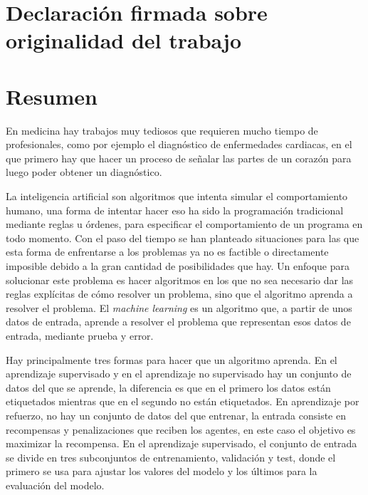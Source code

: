 \documentclass[12pt,a4paper]{article}
\begin{document}
\newpage
\listoftables

\newpage
{}
\section*{Declaración firmada sobre originalidad del trabajo}

\newpage
\section*{Resumen}
En medicina hay trabajos muy tediosos que requieren mucho tiempo de profesionales, como por ejemplo el diagnóstico de enfermedades cardiacas, en el que primero hay que hacer un proceso de señalar las partes de un corazón para luego poder obtener un diagnóstico.
\bigskip

La inteligencia artificial son algoritmos que intenta simular el comportamiento humano, una forma de intentar hacer eso ha sido la programación tradicional mediante reglas u órdenes, para especificar el comportamiento de un programa en todo momento. Con el paso del tiempo se han planteado situaciones para las que esta forma de enfrentarse a los problemas ya no es factible o directamente imposible debido a la gran cantidad de posibilidades que hay. Un enfoque para solucionar este problema es hacer algoritmos en los que no sea necesario dar las reglas explícitas de cómo resolver un problema, sino que el algoritmo aprenda a resolver el problema. El \textit{machine learning} es un algoritmo que, a partir de unos datos de entrada, aprende a resolver el problema que representan esos datos de entrada, mediante prueba y error.
\bigskip

Hay principalmente tres formas para hacer que un algoritmo aprenda. En el aprendizaje supervisado y en el aprendizaje no supervisado hay un conjunto de datos del que se aprende, la diferencia es que en el primero los datos están etiquetados mientras que en el segundo no están etiquetados. En aprendizaje por refuerzo, no hay un conjunto de datos del que entrenar, la entrada consiste en recompensas y penalizaciones que reciben los agentes, en este caso el objetivo es maximizar la recompensa. En el aprendizaje supervisado, el conjunto de entrada se divide en tres subconjuntos de entrenamiento, validación y test, donde el primero se usa para ajustar los valores del modelo y los últimos para la evaluación del modelo.
\bigskip
\end{document}
